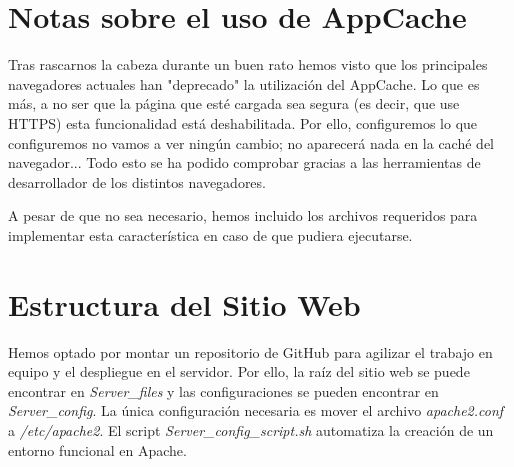 \documentclass{article}[13pt]
\begin{document}
  \section{Notas sobre el uso de AppCache}
    Tras rascarnos la cabeza durante un buen rato hemos visto que los principales navegadores actuales han "deprecado" la utilización del AppCache. Lo que es más, a no ser que la página que esté cargada sea segura (es decir, que use HTTPS) esta funcionalidad está deshabilitada. Por ello, configuremos lo que configuremos no vamos a ver ningún cambio; no aparecerá nada en la caché del navegador... Todo esto se ha podido comprobar gracias a las herramientas de desarrollador de los distintos navegadores.

    A pesar de que no sea necesario, hemos incluido los archivos requeridos para implementar esta característica en caso de que pudiera ejecutarse.

  \section{Estructura del Sitio Web}
    Hemos optado por montar un repositorio de GitHub para agilizar el trabajo en equipo y el despliegue en el servidor. Por ello, la raíz del sitio web se puede encontrar en \textit{Server\_files} y las configuraciones se pueden encontrar en \textit{Server\_config}. La única configuración necesaria es mover el archivo \textit{apache2.conf} a \textit{/etc/apache2}. El script \textit{Server\_config\_script.sh} automatiza la creación de un entorno funcional en Apache.
\end{document}
